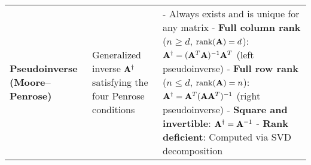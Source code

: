 \documentclass[12pt]{article}
\begin{document}
\begin{longtable}{|>{\bfseries}m{3.5cm}|m{5cm}|m{10.5cm}|}
		\hline
		Pseudoinverse (Moore--Penrose) & Generalized inverse $\mathbf{A}^\dagger$
		satisfying the four Penrose conditions &
		- Always exists and is unique for any matrix \newline
		- \textbf{Full column rank} ($n \geq d$, $\text{rank}(\mathbf{A}) = d$): \newline
		\quad $\mathbf{A}^\dagger = (\mathbf{A}^T \mathbf{A})^{-1} \mathbf{A}^T$ (left pseudoinverse) \newline
		- \textbf{Full row rank} ($n \leq d$, $\text{rank}(\mathbf{A}) = n$): \newline
		\quad $\mathbf{A}^\dagger = \mathbf{A}^T (\mathbf{A} \mathbf{A}^T)^{-1}$ (right pseudoinverse) \newline
		- \textbf{Square and invertible}: $\mathbf{A}^\dagger = \mathbf{A}^{-1}$ \newline
		- \textbf{Rank deficient}: Computed via SVD decomposition \\


\end{longtable}
\end{document}
